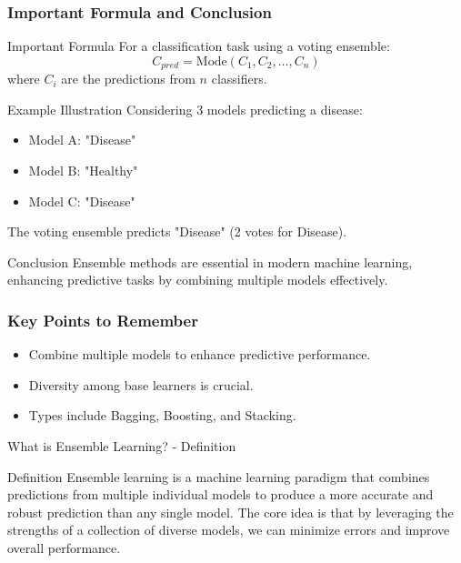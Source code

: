 \documentclass[aspectratio=169]{beamer}
\begin{document}
\begin{frame}[fragile]
    \frametitle{Important Formula and Conclusion}
    
    \begin{block}{Important Formula}
        For a classification task using a voting ensemble:
        \[
        C_{pred} = \text{Mode}(C_1, C_2, \ldots, C_n)
        \]
        where \( C_i \) are the predictions from \( n \) classifiers.
    \end{block}
    
    \begin{block}{Example Illustration}
        Considering 3 models predicting a disease:
        \begin{itemize}
            \item Model A: "Disease"
            \item Model B: "Healthy"
            \item Model C: "Disease"
        \end{itemize}
        The voting ensemble predicts "Disease" (2 votes for Disease).
    \end{block}
    
    \begin{block}{Conclusion}
        Ensemble methods are essential in modern machine learning, enhancing predictive tasks by combining multiple models effectively.
    \end{block}
\end{frame}

\begin{frame}[fragile]
    \frametitle{Key Points to Remember}
    \begin{itemize}
        \item Combine multiple models to enhance predictive performance.
        \item Diversity among base learners is crucial.
        \item Types include Bagging, Boosting, and Stacking.
    \end{itemize}
\end{frame}

\begin{frame}[fragile]{What is Ensemble Learning? - Definition}
    \begin{block}{Definition}
        Ensemble learning is a machine learning paradigm that combines predictions from multiple individual models to produce a more accurate and robust prediction than any single model. The core idea is that by leveraging the strengths of a collection of diverse models, we can minimize errors and improve overall performance.
    \end{block}
\end{frame}
\end{document}
